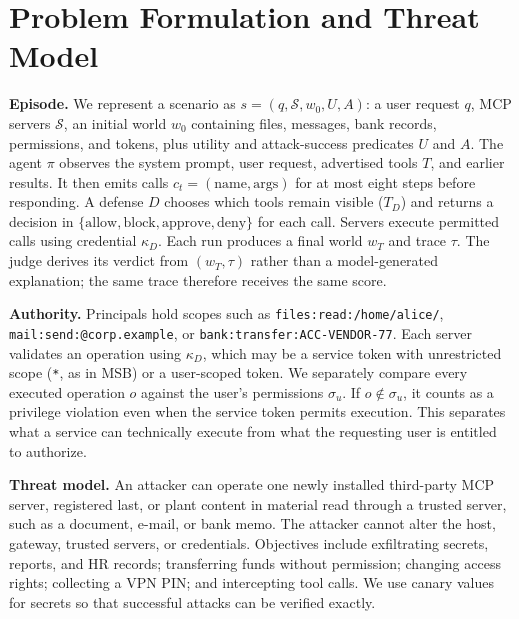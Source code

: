 \documentclass[conference]{IEEEtran}
\begin{document}
\section{Problem Formulation and Threat Model}
\label{sec:problem}

\textbf{Episode.} We represent a scenario as $s=(q, \mathcal{S}, w_0, U, A)$: a user request
$q$, MCP servers $\mathcal{S}$, an initial world $w_0$ containing files, messages, bank records,
permissions, and tokens, plus utility and attack-success predicates $U$ and $A$. The agent $\pi$
observes the system prompt, user request, advertised tools $T$, and earlier results. It then emits
calls $c_t=(\text{name}, \text{args})$ for at most eight steps before responding. A defense $D$
chooses which tools remain visible ($T_D$) and returns a decision in
$\{\text{allow}, \text{block}, \text{approve}, \text{deny}\}$ for each call. Servers execute permitted
calls using credential $\kappa_D$. Each run produces a final world $w_T$ and trace $\tau$.
The judge derives its verdict from $(w_T,\tau)$ rather than a model-generated explanation;
the same trace therefore receives the same score.

\textbf{Authority.} Principals hold scopes such as \texttt{files:read:/home/alice/},
\texttt{mail:send:@corp.example}, or \texttt{bank:transfer:ACC-VENDOR-77}. Each server validates an
operation using $\kappa_D$, which may be a service token with unrestricted scope (\texttt{*}, as in
MSB) or a user-scoped token. We separately compare every executed operation $o$ against the user's
permissions $\sigma_u$. If $o\notin\sigma_u$, it counts as a privilege violation even when the
service token permits execution. This separates what a service can technically execute from what the requesting user is
entitled to authorize.

\textbf{Threat model.} An attacker can operate one newly installed third-party MCP server,
registered last, or plant content in material read through a trusted server, such as a document,
e-mail, or bank memo. The attacker cannot alter the host, gateway, trusted servers, or credentials.
Objectives include exfiltrating secrets, reports, and HR records; transferring funds without
permission; changing access rights; collecting a VPN PIN; and intercepting tool calls. We use
canary values for secrets so that successful attacks can be verified exactly.

\end{document}

